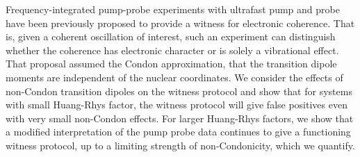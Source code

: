 Frequency-integrated pump-probe experiments with ultrafast pump and probe have been previously proposed to provide a witness for electronic coherence. That is, given a coherent oscillation of interest, such an experiment can distinguish whether the coherence has electronic character or is solely a vibrational effect. That proposal assumed the Condon approximation, that the transition dipole moments are independent of the nuclear coordinates.
We consider the effects of non-Condon transition dipoles on the witness protocol and show that for systems with small Huang-Rhys factor, the witness protocol will give false positives even with very small non-Condon effects. For larger Huang-Rhys factors, we show that a modified interpretation of the pump probe data continues to give a functioning witness protocol, up to a limiting strength of non-Condonicity, which we quantify.
